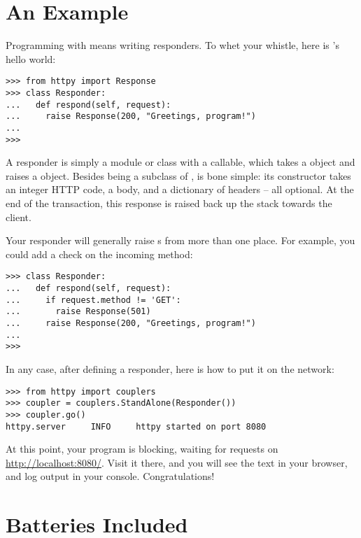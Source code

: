 \section{An Example \label{example}}

Programming with  means writing responders. To whet your whistle,
here is 's hello world:

\begin{verbatim}
>>> from httpy import Response
>>> class Responder:
...   def respond(self, request):
...     raise Response(200, "Greetings, program!")
...
>>>
\end{verbatim}

A responder is simply a module or class with a  callable, which
takes a  object and raises a  object. Besides
being a subclass of ,  is bone simple: its
constructor takes an integer HTTP code, a body, and a dictionary of headers --
all optional. At the end of the transaction, this response is raised back up the
stack towards the client.

Your responder will generally raise s from more than one place.
For example, you could add a check on the incoming method:

\begin{verbatim}
>>> class Responder:
...   def respond(self, request):
...     if request.method != 'GET':
...       raise Response(501)
...     raise Response(200, "Greetings, program!")
...
>>>
\end{verbatim}

In any case, after defining a responder, here is how to put it on the network:

\begin{verbatim}
>>> from httpy import couplers
>>> coupler = couplers.StandAlone(Responder())
>>> coupler.go()
httpy.server     INFO     httpy started on port 8080
\end{verbatim}

At this point, your program is blocking, waiting for requests on
\url{http://localhost:8080/}. Visit it there, and you will see the text
 in your browser, and log output in your console.
Congratulations!



\section{Batteries Included \label{batteries}}

